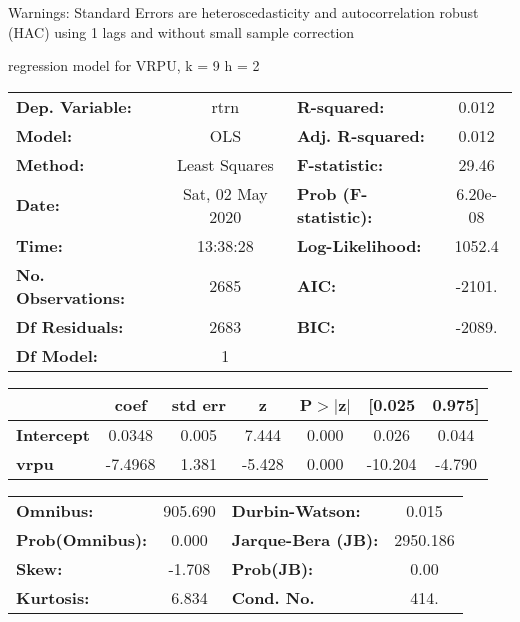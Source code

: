 Warnings: \newline
 [1] Standard Errors are heteroscedasticity and autocorrelation robust (HAC) using 1 lags and without small sample correction\ 

regression model for VRPU, k = 9 h = 2\begin{center}
\begin{tabular}{lclc}
\toprule
\textbf{Dep. Variable:}    &       rtrn       & \textbf{  R-squared:         } &     0.012   \\
\textbf{Model:}            &       OLS        & \textbf{  Adj. R-squared:    } &     0.012   \\
\textbf{Method:}           &  Least Squares   & \textbf{  F-statistic:       } &     29.46   \\
\textbf{Date:}             & Sat, 02 May 2020 & \textbf{  Prob (F-statistic):} &  6.20e-08   \\
\textbf{Time:}             &     13:38:28     & \textbf{  Log-Likelihood:    } &    1052.4   \\
\textbf{No. Observations:} &        2685      & \textbf{  AIC:               } &    -2101.   \\
\textbf{Df Residuals:}     &        2683      & \textbf{  BIC:               } &    -2089.   \\
\textbf{Df Model:}         &           1      & \textbf{                     } &             \\
\bottomrule
\end{tabular}
\begin{tabular}{lcccccc}
                   & \textbf{coef} & \textbf{std err} & \textbf{z} & \textbf{P$> |$z$|$} & \textbf{[0.025} & \textbf{0.975]}  \\
\midrule
\textbf{Intercept} &       0.0348  &        0.005     &     7.444  &         0.000        &        0.026    &        0.044     \\
\textbf{vrpu}      &      -7.4968  &        1.381     &    -5.428  &         0.000        &      -10.204    &       -4.790     \\
\bottomrule
\end{tabular}
\begin{tabular}{lclc}
\textbf{Omnibus:}       & 905.690 & \textbf{  Durbin-Watson:     } &    0.015  \\
\textbf{Prob(Omnibus):} &   0.000 & \textbf{  Jarque-Bera (JB):  } & 2950.186  \\
\textbf{Skew:}          &  -1.708 & \textbf{  Prob(JB):          } &     0.00  \\
\textbf{Kurtosis:}      &   6.834 & \textbf{  Cond. No.          } &     414.  \\
\bottomrule
\end{tabular}
\end{center}

